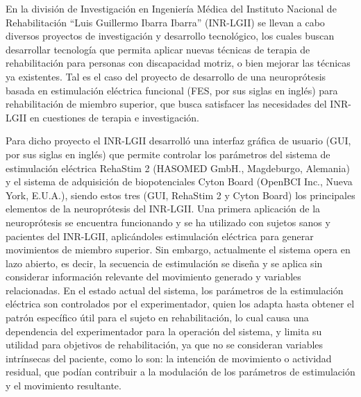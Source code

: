 
En la división de Investigación en Ingeniería Médica del Instituto Nacional de Rehabilitación ``Luis Guillermo Ibarra Ibarra'' (INR-LGII) se llevan a cabo diversos proyectos de investigación y desarrollo tecnológico, los cuales buscan desarrollar tecnología que permita aplicar nuevas técnicas de terapia de rehabilitación para personas con discapacidad motriz, o bien mejorar las técnicas ya existentes. Tal es el caso del proyecto de desarrollo de una neuroprótesis basada en estimulación eléctrica funcional (FES, por sus siglas en inglés) para rehabilitación de miembro superior, que busca satisfacer las necesidades del INR-LGII en cuestiones de terapia e investigación.

Para dicho proyecto el INR-LGII desarrolló una interfaz gráfica de usuario (GUI, por sus siglas en inglés) que permite controlar los parámetros del sistema de estimulación eléctrica RehaStim 2 (HASOMED GmbH., Magdeburgo, Alemania) y el sistema de adquisición de biopotenciales Cyton Board (OpenBCI Inc., Nueva York, E.U.A.), siendo estos tres (GUI, RehaStim 2 y Cyton Board) los principales elementos de la neuroprótesis del INR-LGII. Una primera aplicación de la neuroprótesis se encuentra funcionando y se ha utilizado con sujetos sanos y pacientes del INR-LGII, aplicándoles estimulación eléctrica para generar movimientos de miembro superior. Sin embargo, actualmente el sistema opera en lazo abierto, es decir, la secuencia de estimulación se diseña y se aplica sin considerar información relevante del movimiento generado y variables relacionadas. En el estado actual del sistema, los parámetros de la estimulación eléctrica son controlados por el experimentador, quien los adapta hasta obtener el patrón específico útil para el sujeto en rehabilitación, lo cual causa una dependencia del experimentador para la operación del sistema, y limita su utilidad para objetivos de rehabilitación, ya que no se consideran variables intrínsecas del paciente, como lo son: la intención de movimiento o actividad residual, que podían contribuir a la modulación de los parámetros de estimulación y el movimiento resultante.


